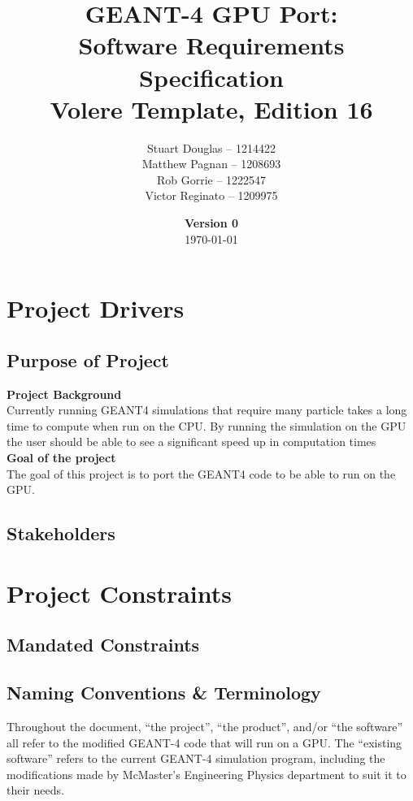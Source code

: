 \documentclass[12pt]{article}
\title{
	\LARGE GEANT-4 GPU Port:
	\\\vspace{10mm}
	\large \textbf{Software Requirements Specification}
	\\Volere Template, Edition 16
	\vspace{40mm}
}
\author{
	Stuart Douglas -- 1214422
	\\Matthew Pagnan -- 1208693
	\\Rob Gorrie -- 1222547
	\\Victor Reginato -- 1209975
	\vspace{10mm}
}
\date{\vfill \textbf{Version 0}\\ \today}
\begin{document}

\maketitle
\newpage


\tableofcontents
{}

\section{Project Drivers}

\subsection{Purpose of Project} %
\textbf{Project Background}\\
Currently running GEANT4 simulations that require many particle takes a long time to compute when run on the CPU. By running the simulation on the GPU the user should be able to see a significant speed up in computation times\\
\newline
\textbf{Goal of the project}\\
The goal of this project is to port the GEANT4 code to be able to run on the GPU.

\subsection{Stakeholders} %

\section{Project Constraints}
\subsection{Mandated Constraints} %

\subsection{Naming Conventions \& Terminology} %
Throughout the document, ``the project'', ``the product'', and/or ``the software'' all refer to the modified GEANT-4 code that will run on a GPU. The ``existing software'' refers to the current GEANT-4 simulation program, including the modifications made by McMaster's Engineering Physics department to suit it to their needs.\\
\end{document}

